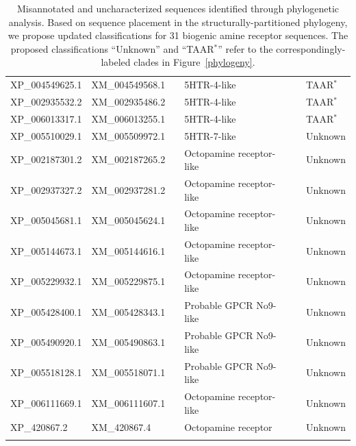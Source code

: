 \documentclass[fleqn,10pt]{wlpeerj}
\begin{document}
\begin{table}[htbp]
\begin{tabular}{l l l l l l}
		XP\_004549625.1 & XM\_004549568.1 & \qquad \qquad & 5HTR-4-like & \qquad \qquad & TAAR$^\ast$ \\
		XP\_002935532.2 & XM\_002935486.2 & \qquad \qquad & 5HTR-4-like & \qquad \qquad & TAAR$^\ast$ \\
		XP\_006013317.1 & XM\_006013255.1 & \qquad \qquad & 5HTR-4-like & \qquad \qquad & TAAR$^\ast$ \\
		XP\_005510029.1 & XM\_005509972.1 & \qquad \qquad & 5HTR-7-like & \qquad \qquad & Unknown \\
		XP\_002187301.2 & XM\_002187265.2 & \qquad \qquad & Octopamine receptor-like & \qquad \qquad & Unknown \\
		XP\_002937327.2 & XM\_002937281.2 & \qquad \qquad & Octopamine receptor-like & \qquad \qquad & Unknown \\
		XP\_005045681.1 & XM\_005045624.1 & \qquad \qquad & Octopamine receptor-like & \qquad \qquad & Unknown \\
		XP\_005144673.1 & XM\_005144616.1 & \qquad \qquad & Octopamine receptor-like & \qquad \qquad & Unknown \\
		XP\_005229932.1 & XM\_005229875.1 & \qquad \qquad & Octopamine receptor-like & \qquad \qquad & Unknown \\
		XP\_005428400.1 & XM\_005428343.1 & \qquad \qquad & Probable GPCR No9-like & \qquad \qquad & Unknown \\
		XP\_005490920.1 & XM\_005490863.1 & \qquad \qquad & Probable GPCR No9-like & \qquad \qquad & Unknown \\
		XP\_005518128.1 & XM\_005518071.1 & \qquad \qquad & Probable GPCR No9-like & \qquad \qquad & Unknown \\
		XP\_006111669.1 & XM\_006111607.1 & \qquad \qquad & Octopamine receptor-like & \qquad \qquad & Unknown \\
		XP\_420867.2 & XM\_420867.4 & \qquad \qquad & Octopamine receptor & \qquad \qquad & Unknown \\
		\noalign{\smallskip}\hline\noalign{\smallskip} 
	\end{tabular}
	\caption{\label{tab:classif} Misannotated and uncharacterized sequences identified through phylogenetic analysis. Based on sequence placement in the structurally-partitioned phylogeny, we propose updated classifications for 31 biogenic amine receptor sequences. The proposed classifications ``Unknown'' and ``TAAR$^\ast$'' refer to the correspondingly-labeled clades in Figure~\ref{phylogeny}.}
\end{table}
\end{document}
